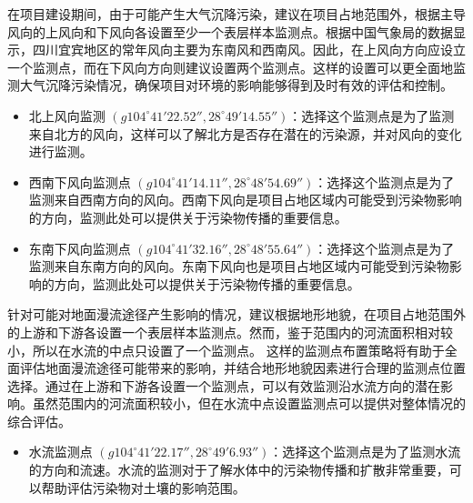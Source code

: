 在项目建设期间，由于可能产生大气沉降污染，建议在项目占地范围外，根据主导风向的上风向和下风向各设置至少一个表层样本监测点。根据中国气象局的数据显示，四川宜宾地区的常年风向主要为东南风和西南风。因此，在上风向方向应设立一个监测点，而在下风向方向则建议设置两个监测点。这样的设置可以更全面地监测大气沉降污染情况，确保项目对环境的影响能够得到及时有效的评估和控制。
\begin{itemize}
    \item 北上风向监测 $(g104^{\circ}41'22.52'',28^{\circ}49'14.55'')$：选择这个监测点是为了监测来自北方的风向，这样可以了解北方是否存在潜在的污染源，并对风向的变化进行监测。
    \item 西南下风向监测点 $(g104^{\circ}41'14.11'',28^{\circ}48'54.69'')$：选择这个监测点是为了监测来自西南方向的风向。西南下风向是项目占地区域内可能受到污染物影响的方向，监测此处可以提供关于污染物传播的重要信息。
    \item 东南下风向监测点 $(g104^{\circ}41'32.16'',28^{\circ}48'55.64'')$：选择这个监测点是为了监测来自东南方向的风向。东南下风向也是项目占地区域内可能受到污染物影响的方向，监测此处可以提供关于污染物传播的重要信息。
\end{itemize}

针对可能对地面漫流途径产生影响的情况，建议根据地形地貌，在项目占地范围外的上游和下游各设置一个表层样本监测点。然而，鉴于范围内的河流面积相对较小，所以在水流的中点只设置了一个监测点。
这样的监测点布置策略将有助于全面评估地面漫流途径可能带来的影响，并结合地形地貌因素进行合理的监测点位置选择。通过在上游和下游各设置一个监测点，可以有效监测沿水流方向的潜在影响。虽然范围内的河流面积较小，但在水流中点设置监测点可以提供对整体情况的综合评估。
\begin{itemize}
    \item 水流监测点 $(g104^{\circ}41'22.17'',28^{\circ}49'6.93'')$：选择这个监测点是为了监测水流的方向和流速。水流的监测对于了解水体中的污染物传播和扩散非常重要，可以帮助评估污染物对土壤的影响范围。
\end{itemize}

